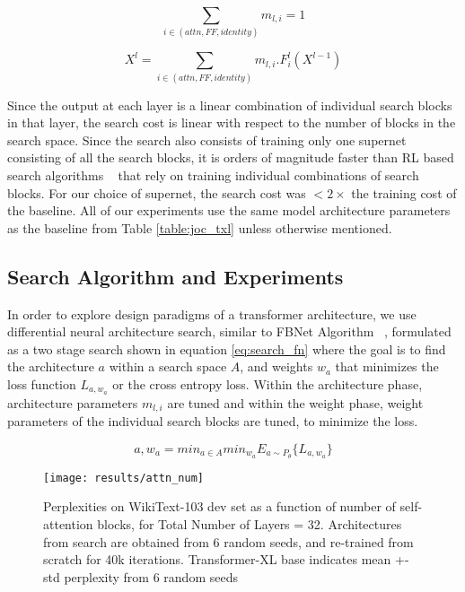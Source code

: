 \documentclass[11pt]{article}
\begin{document}
\begin{equation}
\sum_{i \in (attn, FF, identity)} m_{l,i}=1
\label{eqn:arch_params}
\end{equation}

\begin{equation}
X^{l}=\sum_{i \in (attn, FF, identity)} m_{l,i}. F^{l}_{i} (X^{l-1})
\label{eqn:layer_output}
\end{equation}

Since the output at each layer is a linear combination of individual search blocks in that layer, the search cost is linear with respect to the number of blocks in the search space. Since the search also consists of training only one supernet consisting of all the search blocks, it is orders of magnitude faster than RL based search algorithms ~\citep{rl1,rl2} that rely on training individual combinations of search blocks. For our choice of supernet, the search cost was $<2 \times$ the training cost of the baseline. All of our experiments use the same model architecture parameters as the baseline from Table \ref{table:joc_txl} unless otherwise mentioned.

\subsection{Search Algorithm and Experiments} \label{observations}

In order to explore design paradigms of a transformer architecture, we use differential neural architecture search, similar to FBNet Algorithm ~\citep{fbnet}, formulated as a two stage search shown in equation \ref{eq:search_fn} where the goal is to find the architecture $a$ within a search space $A$, and weights $w_a$ that minimizes the loss function $L_{a, w_a}$ or the cross entropy loss. Within the architecture phase, architecture parameters $m_{l,i}$ are tuned and within the weight phase, weight parameters of the individual search blocks are tuned, to minimize the loss.

\begin{equation}\label{eq:search_fn}
a,w_a=min_{a \in A} min_{w_a} E_{a \sim P_{\theta}} \big\{ L_{a, w_a} \big\}
\end{equation}





\begin{figure}
\centering
\texttt{[image: results/attn\_num]}
\caption{Perplexities on WikiText-103 dev set as a function of number of self-attention blocks, for Total Number of Layers = 32. Architectures from search are obtained from 6 random seeds, and re-trained from scratch for 40k iterations. Transformer-XL base indicates mean +- std perplexity from 6 random seeds}
\label{fig:attn_num}
\end{figure}
\end{document}
